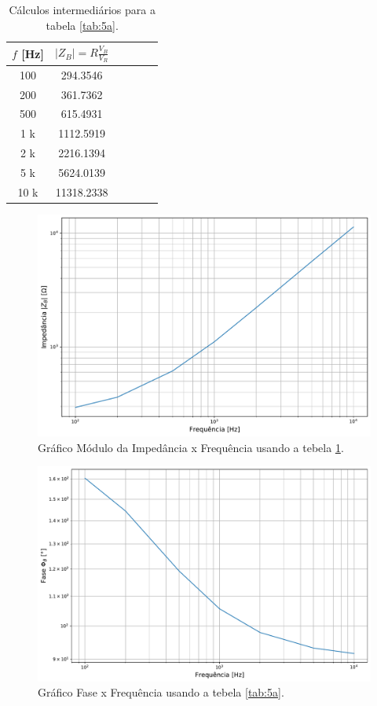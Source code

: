 \documentclass[11pt]{article}
\begin{document}
\begin{table}[h!]
  \centering
  \begin{tabular}{|c|c|c|c|c|c|}
    \hline
    $f$ [Hz] & $|Z_{B}| = R\frac{V_{B}}{V_{R}}$ \\
    \hline
    100      & 294.3546                         \\
    200      & 361.7362                         \\
    500      & 615.4931                         \\
    1 k      & 1112.5919                        \\
    2 k      & 2216.1394                        \\
    5 k      & 5624.0139                        \\
    10 k     & 11318.2338                       \\
    \hline
  \end{tabular}
  \caption{Cálculos intermediários para a tabela \ref{tab:5a}.}
  \label{tab:5b}
\end{table}

\begin{figure}[h!]
  \centering
  \includegraphics[width=.9\textwidth]{fig/5a}
  \caption{Gráfico Módulo da Impedância x Frequência usando a tebela \ref{tab:5b}.}
  \label{fig:5a}
\end{figure}

\pagebreak

\begin{figure}[h!]
  \centering
  \includegraphics[width=.9\textwidth]{fig/5b}
  \caption{Gráfico Fase x Frequência usando a tebela \ref{tab:5a}.}
  \label{fig:5a}
\end{figure}
\end{document}
